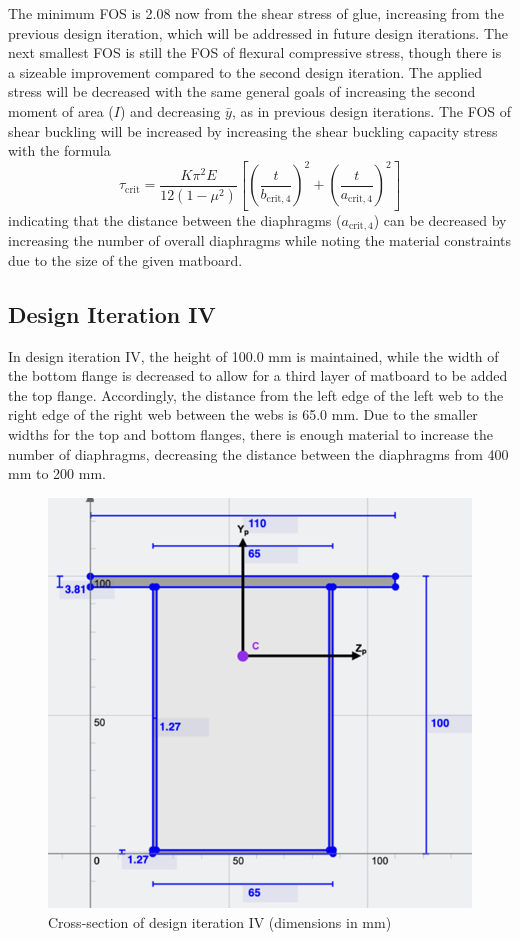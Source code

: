 \documentclass[11pt]{article}
\newcommand{\imagewidth}{.5\linewidth}
\begin{document}
The minimum FOS is 2.08 now from the shear stress of glue, increasing from the previous design iteration, which will be addressed in future design iterations. The next smallest FOS is still the FOS of flexural compressive stress, though there is a sizeable improvement compared to the second design iteration.
The applied stress will be decreased with the same general goals of increasing the second moment of area ($I$) and decreasing $\bar{y}$, as in previous design iterations.
The FOS of shear buckling will be increased by increasing the shear buckling capacity stress with the formula
\[\tau_{\mathrm{crit}}=\frac{K\pi^2E}{12\left(1-\mu^2\right)}\left[\left(\frac{t}{b_{\mathrm{crit,4}}}\right)^2+\left(\frac{t}{a_{\mathrm{crit,4}}}\right)^2\right]\]
indicating that the distance between the diaphragms ($a_{\mathrm{crit,4}}$) can be decreased by increasing the number of overall diaphragms while noting the material constraints due to the size of the given matboard.

\subsection{Design Iteration IV}

In design iteration IV, the height of 100.0 mm is maintained, while the width of the bottom flange is decreased to allow for a third layer of matboard to be added the top flange. Accordingly, the distance from the left edge of the left web to the right edge of the right web between the webs is 65.0 mm. Due to the smaller widths for the top and bottom flanges, there is enough material to increase the number of diaphragms, decreasing the distance between the diaphragms from 400 mm to 200 mm.

\clearpage
\begin{figure}[h]
    \centering
    \includegraphics[width=\imagewidth]{img/design-4-cs.png}
    \caption{Cross-section of design iteration IV (dimensions in mm)}
    \label{d4}
\end{figure}
\end{document}

